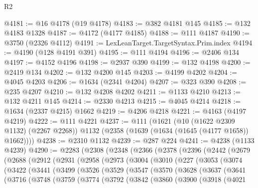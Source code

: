 \begin{lexlean}{R2}
\begin{coremodule}
@4181 := @16 @4178 (@19 @4178)
@4183 := @382 @4181 @145
@4185 := @132 @4183 @1328
@4187 := @4172 (@4177 @4185)
@4188 := @111 @4187
@4190 := @3750 (@2326 @4112)
@4191 := LexLeanTarget.TargetSyntax.Prim.index
@4194 := @4190 (@128 @4191 @391)
@4195 := @111 @4194
@4196 := @2406 @134
@4197 := @4152 @4196
@4198 := @2937 @390
@4199 := @132 @4198
@4200 := @2419 @134
@4202 := @132 @4200 @145
@4203 := @4199 @4202
@4204 := @4045 @4203
@4206 := @1634 (@2341 @4204)
@4207 := @323 @390
@4208 := @235 @4207
@4210 := @132 @4208 @4202
@4211 := @1133 @4210
@4213 := @132 @4211 @145
@4214 := @2330 @4213
@4215 := @4045 @4214
@4218 := @1634 (@2337 @4215) @1662
@4219 := @4206 @4218
@4221 := @4163 (@4197 @4219)
@4222 := @111 @4221
@4237 := @111
    (@1621
      (@10 (@1622 @2309 @1132) (@2267 @2268))
      @1132
      (@2358 (@1639 (@1634 (@1645 (@4177 @1658)) @1662))))
@4238 := @2310 @1132
@4239 := @287 @224
@4241 := @4238 (@1133 @4239)
@4290 := @2283
    (@2308
      (@2348
        (@2366
          (@2378
            (@2396
              (@2442
                (@2679
                  (@2688
                    (@2912
                      (@2931
                        (@2958
                          (@2973
                            (@3004
                              (@3010
                                (@227
                                  (@3053
                                    (@3074
                                      (@3422
                                        (@3441
                                          (@3499
                                            (@3526
                                              (@3529
                                                (@3547
                                                  (@3570
                                                    (@3628
                                                      (@3637
                                                        (@3641
                                                          (@3716
                                                            (@3748
                                                              (@3759
                                                                (@3774
                                                                  (@3792
                                                                    (@3842
                                                                      (@3860
                                                                        (@3900
                                                                          (@3918
                                                                            (@4021

\end{coremodule}
\end{lexlean}
